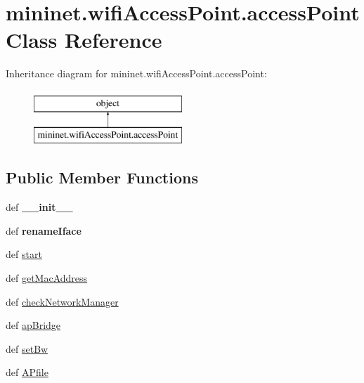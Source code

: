 \hypertarget{classmininet_1_1wifiAccessPoint_1_1accessPoint}{\section{mininet.\-wifi\-Access\-Point.\-access\-Point Class Reference}
\label{classmininet_1_1wifiAccessPoint_1_1accessPoint}
}
Inheritance diagram for mininet.\-wifi\-Access\-Point.\-access\-Point\-:\begin{figure}[H]
\begin{center}
\leavevmode
\includegraphics[height=2.000000cm]{classmininet_1_1wifiAccessPoint_1_1accessPoint}
\end{center}
\end{figure}
\subsection*{Public Member Functions}
\begin{DoxyCompactItemize}
\item 
\hypertarget{classmininet_1_1wifiAccessPoint_1_1accessPoint_a12e7868d8c55d9717687163ad5e95daf}{def {\bfseries \-\_\-\-\_\-init\-\_\-\-\_\-}}\label{classmininet_1_1wifiAccessPoint_1_1accessPoint_a12e7868d8c55d9717687163ad5e95daf}

\item 
\hypertarget{classmininet_1_1wifiAccessPoint_1_1accessPoint_a3cbec4757d89e8f3317726a73ac51350}{def {\bfseries rename\-Iface}}\label{classmininet_1_1wifiAccessPoint_1_1accessPoint_a3cbec4757d89e8f3317726a73ac51350}

\item 
def \hyperlink{classmininet_1_1wifiAccessPoint_1_1accessPoint_a925e7c762d13c896358ef4349b40aa65}{start}
\item 
def \hyperlink{classmininet_1_1wifiAccessPoint_1_1accessPoint_ae9d3adbb08daab476495ec53903560c8}{get\-Mac\-Address}
\item 
def \hyperlink{classmininet_1_1wifiAccessPoint_1_1accessPoint_a34e66b40e2ac3d09580f408b80289a41}{check\-Network\-Manager}
\item 
def \hyperlink{classmininet_1_1wifiAccessPoint_1_1accessPoint_adc20e2474f8f7822d2c3fbfee5aa6299}{ap\-Bridge}
\item 
def \hyperlink{classmininet_1_1wifiAccessPoint_1_1accessPoint_affd8f039b13b30a03aa84c59a93c2a20}{set\-Bw}
\item 
def \hyperlink{classmininet_1_1wifiAccessPoint_1_1accessPoint_ae3d5cced9fea44b92512a13c3d118c37}{A\-Pfile}
\end{DoxyCompactItemize}
